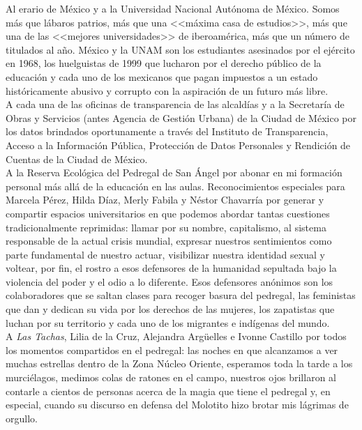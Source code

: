 Al erario de México y a la Universidad Nacional Autónoma de México. Somos más que lábaros patrios, más que una <<máxima casa de estudios>>, más que una de las <<mejores universidades>> de iberoamérica, más que un número de titulados al año. México y la UNAM son los estudiantes asesinados por el ejército en 1968, los huelguistas de 1999 que lucharon por el derecho público de la educación y cada uno de los mexicanos que pagan impuestos a un estado históricamente abusivo y corrupto con la aspiración de un futuro más libre.\\

A cada una de las oficinas de transparencia de las alcaldías y a la Secretaría de Obras y Servicios (antes Agencia de Gestión Urbana) de la Ciudad de México  por los datos brindados oportunamente a través del Instituto de Transparencia, Acceso a la Información Pública, Protección de Datos Personales y Rendición de Cuentas de la Ciudad de México.\\

A la Reserva Ecológica del Pedregal de San Ángel por abonar en mi formación personal más allá de la educación en las aulas. Reconocimientos especiales para Marcela Pérez, Hilda Díaz, Merly Fabila y Néstor Chavarría por generar y compartir espacios universitarios en que podemos abordar tantas cuestiones tradicionalmente reprimidas: llamar por su nombre, capitalismo, al sistema responsable de la actual crisis mundial, expresar nuestros sentimientos como parte fundamental de nuestro actuar, visibilizar nuestra identidad sexual y voltear, por fin, el rostro a esos defensores de la humanidad sepultada bajo la violencia del poder y el odio a lo diferente. Esos defensores anónimos son los colaboradores que se saltan clases para recoger basura del pedregal, las feministas que dan y dedican su vida por los derechos de las mujeres, los zapatistas que luchan por su territorio y cada uno de los migrantes e indígenas del mundo.\\

A \textit{Las Tachas}, Lilia de la Cruz, Alejandra Argüelles e Ivonne Castillo por todos los momentos compartidos en el pedregal: las noches en que alcanzamos a ver muchas estrellas dentro de la Zona Núcleo Oriente, esperamos toda la tarde a los murciélagos, medimos colas de ratones en el campo, nuestros ojos brillaron al contarle a cientos de personas acerca de la magia que tiene el pedregal y, en especial, cuando su discurso en defensa del Molotito hizo brotar mis lágrimas de orgullo.\\ 

